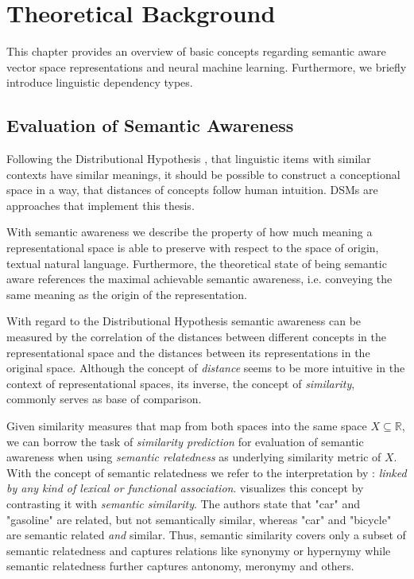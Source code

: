 \section{Theoretical Background}

This chapter provides an overview of basic concepts regarding semantic aware vector space representations and neural machine learning. Furthermore, we briefly introduce linguistic dependency types.

\subsection{Evaluation of Semantic Awareness} \label{subsec:eval_semantic_awareness}
Following the Distributional Hypothesis \autocite{harris_distributional_1954}, that linguistic items with similar contexts have similar meanings, it should be possible to construct a conceptional space in a way, that distances of concepts follow human intuition. 
\acfp{DSM} \autocite{landauer_solution_1997,schutze_automatic_1998} are approaches that implement this thesis.

With semantic awareness we describe the property of how much meaning a representational space is able to preserve with respect to the space of origin, textual natural language. Furthermore, the theoretical state of being semantic aware references the maximal achievable semantic awareness, i.e. conveying the same meaning as the origin of the representation.

With regard to the Distributional Hypothesis semantic awareness can be measured by the correlation of the distances between different concepts in the representational space and the distances between its representations in the original space. Although the concept of \textit{distance} seems to be more intuitive in the context of representational spaces, its inverse, the concept of \textit{similarity}, commonly serves as base of comparison.  

Given similarity measures that map from both spaces into the same space $X \subseteq \mathbb{R}$, we can borrow the task of \textit{similarity prediction} for evaluation of semantic awareness when using \textit{semantic relatedness} as underlying similarity metric of $X$. With the concept of semantic relatedness we refer to the interpretation by \textcite{budanitsky_evaluating_2006}: \textit{linked by any kind of lexical or functional association}. \textcite{resnik_semantic_1999} visualizes this concept by contrasting it with \textit{semantic similarity}. The authors state that "car" and "gasoline" are related, but not semantically similar, whereas "car" and "bicycle" are semantic related \textit{and} similar. Thus, semantic similarity covers only a subset of semantic relatedness and captures relations like synonymy or hypernymy while semantic relatedness further captures antonomy, meronymy and others.

